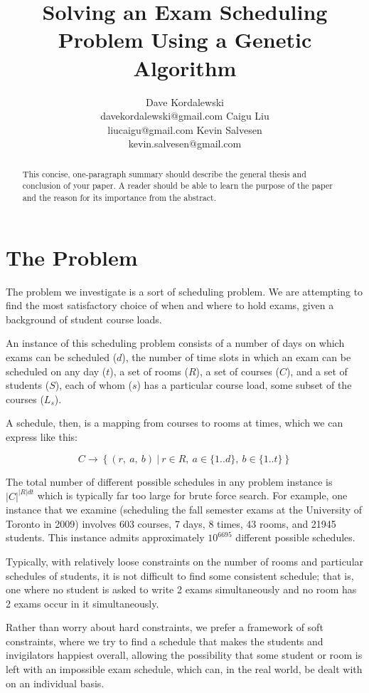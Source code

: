 \documentclass[letterpaper]{article}
\title{Solving an Exam Scheduling Problem Using a Genetic Algorithm}
\author{Dave Kordalewski \\ davekordalewski@gmail.com
   \And Caigu Liu \\liucaigu@gmail.com
   \And Kevin Salvesen \\ kevin.salvesen@gmail.com}
\begin{document}
\maketitle

\begin{abstract}
  This concise, one-paragraph summary should describe the general thesis
  and conclusion of your paper. A reader should be able to learn the purpose
  of the paper and the reason for its importance from the abstract.
\end{abstract}

\section{The Problem}
  The problem we investigate is a sort of scheduling problem. 
  We are attempting to find the most satisfactory choice of when
  and where to hold exams, given a background of student course loads. 

  An instance of this scheduling problem consists of a number of days
  on which exams can be scheduled ($d$), the number of time slots in which
  an exam can be scheduled on any day ($t$), a set of rooms ($R$), a set of
  courses ($C$), and a set of students ($S$), each of whom ($s$) has a
  particular course load, some subset of the courses ($L_s$).

  A schedule, then, is a mapping from courses to rooms at times, 
  which we can express like this:
  
  \[ C \rightarrow \left\{(r,\ a,\ b)\ |\ r\in R,\ a\in \{1..d\},\ b\in \{1..t\}\right\} \]
  
  The total number of different possible schedules in any problem instance is
  $|C|^{|R|dt}$ which is typically far too large for brute force search.
  For example, one instance that we examine (scheduling the fall semester
  exams at the University of Toronto in 2009) involves 603 courses, 7 days,
  8 times, 43 rooms, and 21945 students. This instance admits approximately 
  $10^{6695}$ different possible schedules.

  Typically, with relatively loose constraints on the number of rooms and 
  particular schedules of students, it is not difficult to find some consistent
  schedule; that is, one where no student is asked to write 2 exams
  simultaneously and no room has 2 exams occur in it simultaneously.

  Rather than worry about hard constraints, we prefer a framework of soft 
  constraints, where we try to find a schedule that makes the students and 
  invigilators happiest overall, allowing the possibility that some student 
  or room is left with an impossible exam schedule, which can, in the real 
  world, be dealt with on an individual basis.
  
\end{document}
